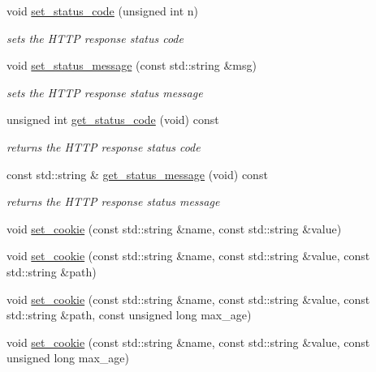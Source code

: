 \begin{DoxyCompactItemize}
\item 
void \hyperlink{classpion_1_1http_1_1response_a3f84cd25cec31c9ca4b0b5718f6d58ed}{set\-\_\-status\-\_\-code} (unsigned int n)
\begin{DoxyCompactList}\small\item\em sets the H\-T\-T\-P response status code \end{DoxyCompactList}\item 
void \hyperlink{classpion_1_1http_1_1response_a0d991f62da50d7bd74c0d21334bec2b9}{set\-\_\-status\-\_\-message} (const std\-::string \&msg)
\begin{DoxyCompactList}\small\item\em sets the H\-T\-T\-P response status message \end{DoxyCompactList}\item 
unsigned int \hyperlink{classpion_1_1http_1_1response_a31c291703dda1fd25efc920b9b35fca2}{get\-\_\-status\-\_\-code} (void) const 
\begin{DoxyCompactList}\small\item\em returns the H\-T\-T\-P response status code \end{DoxyCompactList}\item 
const std\-::string \& \hyperlink{classpion_1_1http_1_1response_a58829c8e1cbb298135fd1c3895b54ba8}{get\-\_\-status\-\_\-message} (void) const 
\begin{DoxyCompactList}\small\item\em returns the H\-T\-T\-P response status message \end{DoxyCompactList}\item 
void \hyperlink{classpion_1_1http_1_1response_a49aa79083d321eabfc4991aa0194fb09}{set\-\_\-cookie} (const std\-::string \&name, const std\-::string \&value)
\item 
void \hyperlink{classpion_1_1http_1_1response_a5e913a111e16773e2da83adf036a1431}{set\-\_\-cookie} (const std\-::string \&name, const std\-::string \&value, const std\-::string \&path)
\item 
void \hyperlink{classpion_1_1http_1_1response_ad5d56b58acc9a5f93f66f48972749345}{set\-\_\-cookie} (const std\-::string \&name, const std\-::string \&value, const std\-::string \&path, const unsigned long max\-\_\-age)
\item 
void \hyperlink{classpion_1_1http_1_1response_aca578f57f31824c1f5b04682c5f65883}{set\-\_\-cookie} (const std\-::string \&name, const std\-::string \&value, const unsigned long max\-\_\-age)
\item 

\end{DoxyCompactItemize}
